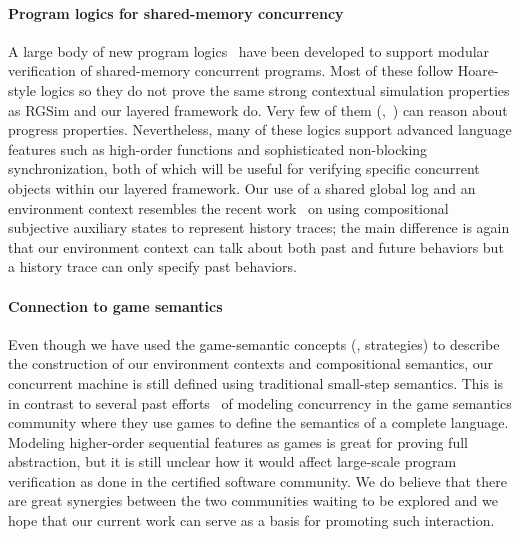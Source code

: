 \paragraph{Program logics for shared-memory concurrency}
A large body of new program
logics~\cite{ohearn:concur04,brookes:concur04,SAGL,vafeiadis:marriage,LRG,verifast,gotsman13,Turon13popl,Turon13icfp,nanevski13,nanevski14,sergey15,sergey15pldi,pinto14,iris15,pinto16}
have been developed to support modular verification of shared-memory
concurrent programs. Most of these follow Hoare-style logics so they
do not prove the same strong contextual simulation properties as RGSim
and our layered framework do. Very few of them (\eg,~\cite{pinto16})
can reason about progress properties. Nevertheless, many of these
logics support advanced language features such as high-order functions
and sophisticated non-blocking synchronization, both of which will be
useful for verifying specific concurrent objects within our layered
framework.  Our use of a shared global log and an environment context
resembles the recent work~\cite{sergey15} on using compositional
subjective auxiliary states to represent history traces; the main
difference is again that our environment context can talk about both
past and future behaviors but a history trace can only specify past
behaviors. 


\paragraph{Connection to game semantics} Even though we have used
the game-semantic concepts (\eg, strategies) to describe the
construction of our environment contexts and compositional semantics,
our concurrent machine is still defined using traditional small-step
semantics.  This is in contrast to several past
efforts~\cite{ghica08,nishimura13,rideau11,abramsky99} of modeling
concurrency in the game semantics community where they use games to
define the semantics of a complete language. Modeling higher-order
sequential features as games is great for proving full abstraction,
but it is still unclear how it would affect large-scale program
verification as done in the certified software community.  We do
believe that there are great synergies between the two communities
waiting to be explored and we hope that our current work can serve as
a basis for promoting such interaction.

